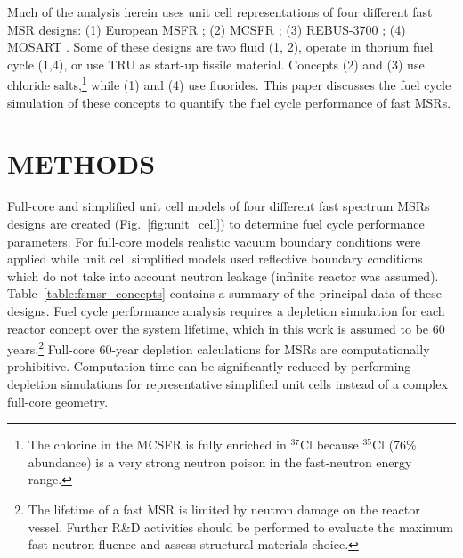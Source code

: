 \documentclass{anstrans}
\begin{document}
Much of the analysis herein uses unit cell representations of four different fast \gls{MSR} designs: 
(1) European \gls{MSFR} \cite{noauthor_final_2015}; 
(2) \gls{MCSFR} \cite{simmons_assessment_1974}; 
(3) REBUS-3700 \cite{mourogov_potentialities_2006}; 
(4) \gls{MOSART} \cite{ignatiev_progress_2007}. 
Some of these designs are two fluid (1, 2), operate in thorium fuel cycle (1,4), or use \gls{TRU} as start-up fissile material. Concepts (2) and (3) use chloride salts,\footnote{The chlorine in the \gls{MCSFR} is fully enriched in $^{37}$Cl because $^{35}$Cl (76\% abundance) is a very strong neutron poison in the fast-neutron energy range.} while (1) and (4) use fluorides. This paper discusses the fuel cycle simulation of these concepts to quantify the fuel cycle performance of fast \glspl{MSR}.

\section{METHODS} 
\label{sec:methods}
Full-core and simplified unit cell models of four different fast spectrum \glspl{MSR} designs are created (Fig.~\ref{fig:unit_cell}) to determine fuel cycle performance parameters. For full-core models realistic vacuum boundary conditions were applied  while unit cell simplified models used reflective boundary conditions which do not take into account neutron leakage (infinite reactor was assumed). Table~\ref{table:fsmsr_concepts} contains a summary of the principal data of these designs. Fuel cycle performance analysis requires a depletion simulation for each reactor concept over the system lifetime, which in this work is assumed to be 60 years.\footnote{The lifetime of a fast \gls{MSR} is limited by neutron damage on the reactor vessel. Further R\&D activities should be performed to evaluate the maximum fast-neutron fluence and assess structural materials choice.} Full-core 60-year depletion calculations for \gls{MSR}s are computationally prohibitive. Computation time can be significantly reduced by performing depletion simulations for representative simplified unit cells instead of a complex full-core geometry.
\end{document}
